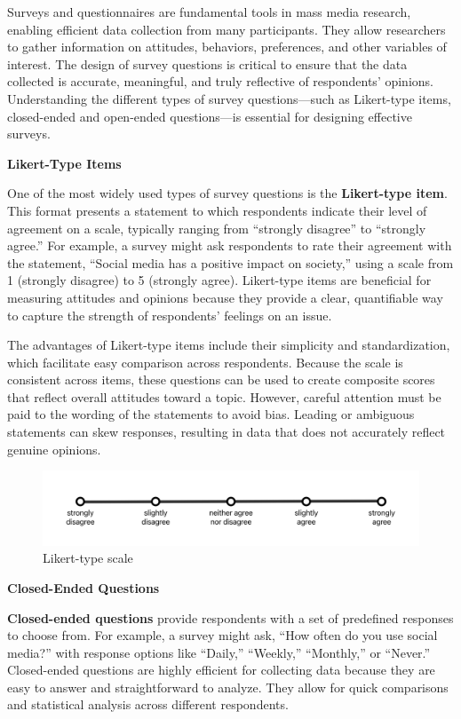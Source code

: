 \documentclass[
]{book}
\begin{document}
Surveys and questionnaires are fundamental tools in mass media research, enabling efficient data collection from many participants. They allow researchers to gather information on attitudes, behaviors, preferences, and other variables of interest. The design of survey questions is critical to ensure that the data collected is accurate, meaningful, and truly reflective of respondents' opinions. Understanding the different types of survey questions---such as Likert-type items, closed-ended and open-ended questions---is essential for designing effective surveys.

\textbf{Likert-Type Items}

One of the most widely used types of survey questions is the \textbf{Likert-type item}. This format presents a statement to which respondents indicate their level of agreement on a scale, typically ranging from ``strongly disagree'' to ``strongly agree.'' For example, a survey might ask respondents to rate their agreement with the statement, ``Social media has a positive impact on society,'' using a scale from 1 (strongly disagree) to 5 (strongly agree). Likert-type items are beneficial for measuring attitudes and opinions because they provide a clear, quantifiable way to capture the strength of respondents' feelings on an issue.

The advantages of Likert-type items include their simplicity and standardization, which facilitate easy comparison across respondents. Because the scale is consistent across items, these questions can be used to create composite scores that reflect overall attitudes toward a topic. However, careful attention must be paid to the wording of the statements to avoid bias. Leading or ambiguous statements can skew responses, resulting in data that does not accurately reflect genuine opinions.

\begin{figure}
\centering
\includegraphics[width=1\textwidth,height=\textheight]{images/likert-scale.png}
\caption{Likert-type scale}
\end{figure}

\textbf{Closed-Ended Questions}

\textbf{Closed-ended questions} provide respondents with a set of predefined responses to choose from. For example, a survey might ask, ``How often do you use social media?'' with response options like ``Daily,'' ``Weekly,'' ``Monthly,'' or ``Never.'' Closed-ended questions are highly efficient for collecting data because they are easy to answer and straightforward to analyze. They allow for quick comparisons and statistical analysis across different respondents.
\end{document}
